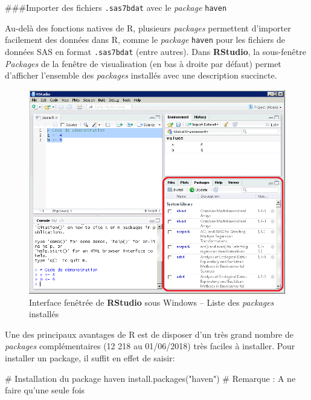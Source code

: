\documentclass[12pt,twosided, notitlepage]{book}
\newenvironment{Shaded}{}{}
\newcommand{\CommentTok}[1]{\textcolor[rgb]{0.00,0.50,0.00}{#1}}
\newcommand{\KeywordTok}[1]{\textcolor[rgb]{0.00,0.00,1.00}{#1}}
\newcommand{\NormalTok}[1]{#1}
\newcommand{\StringTok}[1]{\textcolor[rgb]{0.00,0.50,0.50}{#1}}
\renewenvironment{Shaded}{\begin{snugshade}}{\end{snugshade}}
\begin{document}
\#\#\#Importer des fichiers \texttt{.sas7bdat} avec le \emph{package}
\texttt{haven}

Au-delà des fonctions natives de R, plusieurs \emph{packages} permettent
d'importer facilement des données dans R, comme le \emph{package}
\texttt{haven} pour les fichiers de données SAS en format
\texttt{.sas7bdat} (entre autres). Dans \textbf{RStudio}, la
sous-fenêtre \emph{Packages} de la fenêtre de visualisation (en bas à
droite par défaut) permet d'afficher l'ensemble des \emph{packages}
installés avec une description succincte.

\begin{figure}
\centering
\includegraphics{../figures/Interface_RStudio_3.png}
\caption{Interface fenêtrée de \textbf{RStudio} sous Windows -- Liste
des \emph{packages} installés}
\end{figure}

Une des principaux avantages de R est de disposer d'un très grand nombre
de \emph{packages} complémentaires (12 218 au 01/06/2018) très faciles à
installer. Pour installer un package, il suffit en effet de saisir:

\begin{Shaded}
\begin{Highlighting}[]
\CommentTok{# Installation du package haven}
\KeywordTok{install.packages}\NormalTok{(}\StringTok{"haven"}\NormalTok{)}
\CommentTok{# Remarque : A ne faire qu'une seule fois}
\end{Highlighting}
\end{Shaded}
\end{document}
